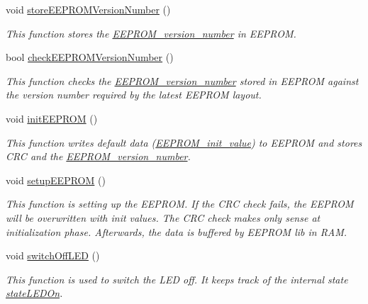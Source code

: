 \begin{DoxyCompactItemize}
void \hyperlink{WIFIOnOff_8ino_a6e14ea51750122bd7a906b9dcf896c53}{store\-E\-E\-P\-R\-O\-M\-Version\-Number} ()
\begin{DoxyCompactList}\small\item\em This function stores the \hyperlink{WIFIOnOff_8ino_aa3109b452678c4716d01ff98ce34a2da}{E\-E\-P\-R\-O\-M\-\_\-version\-\_\-number} in E\-E\-P\-R\-O\-M. \end{DoxyCompactList}\item 
bool \hyperlink{WIFIOnOff_8ino_afd23421ffd3823e5dafd4205f499fd2c}{check\-E\-E\-P\-R\-O\-M\-Version\-Number} ()
\begin{DoxyCompactList}\small\item\em This function checks the \hyperlink{WIFIOnOff_8ino_aa3109b452678c4716d01ff98ce34a2da}{E\-E\-P\-R\-O\-M\-\_\-version\-\_\-number} stored in E\-E\-P\-R\-O\-M against the version number required by the latest E\-E\-P\-R\-O\-M layout. \end{DoxyCompactList}\item 
void \hyperlink{WIFIOnOff_8ino_accde2e704135909387a34453e0dc1293}{init\-E\-E\-P\-R\-O\-M} ()
\begin{DoxyCompactList}\small\item\em This function writes default data (\hyperlink{WIFIOnOff_8ino_a6912b1d0bb01613405a6827632e6d6f4}{E\-E\-P\-R\-O\-M\-\_\-init\-\_\-value}) to E\-E\-P\-R\-O\-M and stores C\-R\-C and the \hyperlink{WIFIOnOff_8ino_aa3109b452678c4716d01ff98ce34a2da}{E\-E\-P\-R\-O\-M\-\_\-version\-\_\-number}. \end{DoxyCompactList}\item 
void \hyperlink{WIFIOnOff_8ino_a3d5cf434e34fce7db249185369616a32}{setup\-E\-E\-P\-R\-O\-M} ()
\begin{DoxyCompactList}\small\item\em This function is setting up the E\-E\-P\-R\-O\-M. If the C\-R\-C check fails, the E\-E\-P\-R\-O\-M will be overwritten with init values. The C\-R\-C check makes only sense at initialization phase. Afterwards, the data is buffered by E\-E\-P\-R\-O\-M lib in R\-A\-M. \end{DoxyCompactList}\item 
void \hyperlink{WIFIOnOff_8ino_a6a76f6c6d6e85f2215f0451b12f1db54}{switch\-Off\-L\-E\-D} ()
\begin{DoxyCompactList}\small\item\em This function is used to switch the L\-E\-D off. It keeps track of the internal state \hyperlink{WIFIOnOff_8ino_aa1ef40baec048d45fac1d51afc521d40}{state\-L\-E\-D\-On}. \end{DoxyCompactList}\item 

\end{DoxyCompactItemize}
